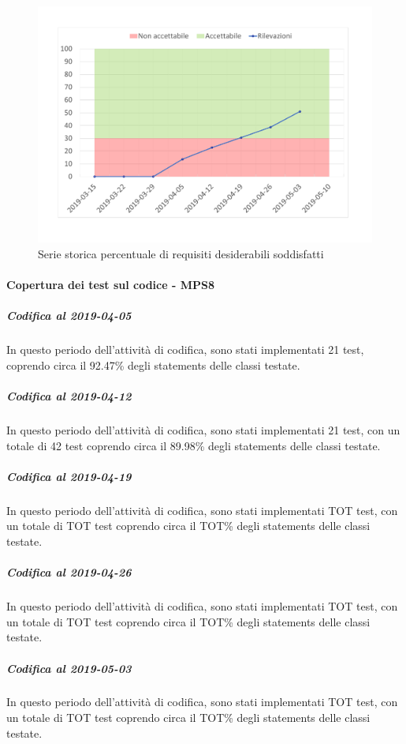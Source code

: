 \begin{figure}[H]
	\centering
	\includegraphics[scale=0.6]{images/resoconto/MPS7Chart.pdf}
	\caption{Serie storica percentuale di requisiti desiderabili soddisfatti}	
\end{figure}

\paragraph{Copertura dei test sul codice - MPS8}
\subparagraph{Codifica al 2019-04-05}
In questo periodo dell'attività di codifica, sono stati implementati 21 test, coprendo circa il 92.47\% degli statements delle classi testate.

\subparagraph{Codifica al 2019-04-12}
In questo periodo dell'attività di codifica, sono stati implementati 21 test, con un totale di 42 test coprendo circa il 89.98\% degli statements delle classi testate.

\subparagraph{Codifica al 2019-04-19}
In questo periodo dell'attività di codifica, sono stati implementati TOT test, con un totale di TOT test coprendo circa il TOT\% degli statements delle classi testate.

\subparagraph{Codifica al 2019-04-26}
In questo periodo dell'attività di codifica, sono stati implementati TOT test, con un totale di TOT test coprendo circa il TOT\% degli statements delle classi testate.

\subparagraph{Codifica al 2019-05-03}
In questo periodo dell'attività di codifica, sono stati implementati TOT test, con un totale di TOT test coprendo circa il TOT\% degli statements delle classi testate.


